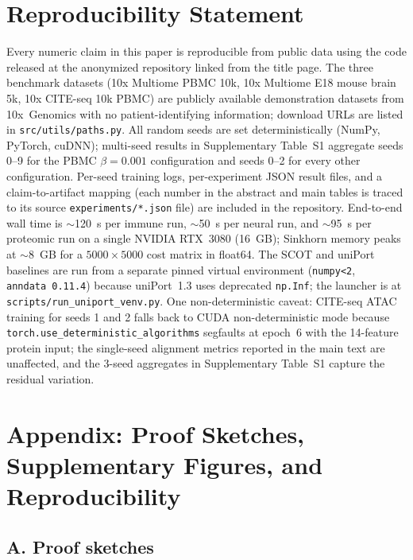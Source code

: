 \documentclass[pmlr]{jmlr}
\begin{document}
\section*{Reproducibility Statement}

Every numeric claim in this paper is reproducible from public data using the code released at the anonymized repository linked from the title page. The three benchmark datasets (10x Multiome PBMC 10k, 10x Multiome E18 mouse brain 5k, 10x CITE-seq 10k PBMC) are publicly available demonstration datasets from 10x~Genomics with no patient-identifying information; download URLs are listed in \texttt{src/utils/paths.py}. All random seeds are set deterministically (NumPy, PyTorch, cuDNN); multi-seed results in Supplementary Table~S1 aggregate seeds 0--9 for the PBMC $\beta=0.001$ configuration and seeds 0--2 for every other configuration. Per-seed training logs, per-experiment JSON result files, and a claim-to-artifact mapping (each number in the abstract and main tables is traced to its source \texttt{experiments/*.json} file) are included in the repository. End-to-end wall time is $\sim$120~s per immune run, $\sim$50~s per neural run, and $\sim$95~s per proteomic run on a single NVIDIA RTX~3080 (16~GB); Sinkhorn memory peaks at $\sim$8~GB for a $5000\times 5000$ cost matrix in float64. The SCOT and uniPort baselines are run from a separate pinned virtual environment (\texttt{numpy<2}, \texttt{anndata~0.11.4}) because uniPort~1.3 uses deprecated \texttt{np.Inf}; the launcher is at \texttt{scripts/run\_uniport\_venv.py}. One non-deterministic caveat: CITE-seq ATAC training for seeds 1 and 2 falls back to CUDA non-deterministic mode because \texttt{torch.use\_deterministic\_algorithms} segfaults at epoch~6 with the 14-feature protein input; the single-seed alignment metrics reported in the main text are unaffected, and the 3-seed aggregates in Supplementary Table~S1 capture the residual variation.



\newpage
\appendix
\section*{Appendix: Proof Sketches, Supplementary Figures, and Reproducibility}
\label{app:theorem}

\subsection*{A. Proof sketches}
\end{document}
